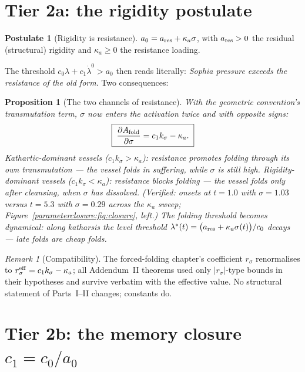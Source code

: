 \documentclass[11pt,a4paper,oneside]{book}
\newcommand{\Afold}{A_{\rm fold}}
\newcommand{\ldz}{\dot\lambda^{0}}
\theoremstyle{plain}
\newtheorem{proposition}{Proposition}[chapter]
\theoremstyle{definition}
\newtheorem{postulate}{Postulate}[chapter]
\theoremstyle{remark}
\newtheorem*{remark}{Remark}
\begin{document}
\section{Tier 2a: the rigidity postulate}

\begin{postulate}[Rigidity is resistance]\label{parameterclosure:post:rigid}
$a_0=a_{\rm res}+\kappa_a\sigma$, with $a_{\rm res}>0$ the residual (structural) rigidity and
$\kappa_a\ge0$ the resistance loading.
\end{postulate}

The threshold $c_0\lambda+c_1\ldz>a_0$ then reads literally: \emph{Sophia pressure exceeds the
resistance of the old form}. Two consequences:

\begin{proposition}[The two channels of resistance]\label{parameterclosure:prop:channels}
With the geometric convention's transmutation term, $\sigma$ now enters the activation twice and
with opposite signs:
\begin{equation}
\boxed{\;\frac{\partial\Afold}{\partial\sigma}=c_1k_\sigma-\kappa_a.\;}
\end{equation}
\emph{Kathartic-dominant} vessels ($c_1k_\sigma>\kappa_a$): resistance promotes folding through its
own transmutation --- the vessel folds in suffering, while $\sigma$ is still high.
\emph{Rigidity-dominant} vessels ($c_1k_\sigma<\kappa_a$): resistance blocks folding --- the vessel
folds only after cleansing, when $\sigma$ has dissolved. (Verified: onsets at $t=1.0$ with
$\sigma=1.03$ versus $t=5.3$ with $\sigma=0.29$ across the $\kappa_a$ sweep;
Figure~\ref{parameterclosure:fig:closure}, left.) The folding threshold becomes \emph{dynamical}: along katharsis the
level threshold $\lambda^\ast(t)=\bigl(a_{\rm res}+\kappa_a\sigma(t)\bigr)/c_0$ decays --- late
folds are cheap folds.
\end{proposition}

\begin{remark}[Compatibility]
The forced-folding chapter's coefficient $r_\sigma$ renormalises to
$r_\sigma^{\rm eff}=c_1k_\sigma-\kappa_a$; all Addendum~II theorems used only $|r_\sigma|$-type
bounds in their hypotheses and survive verbatim with the effective value. No structural statement of
Parts~I--II changes; constants do.
\end{remark}

\section{Tier 2b: the memory closure $c_1=c_0/a_0$}
\end{document}
